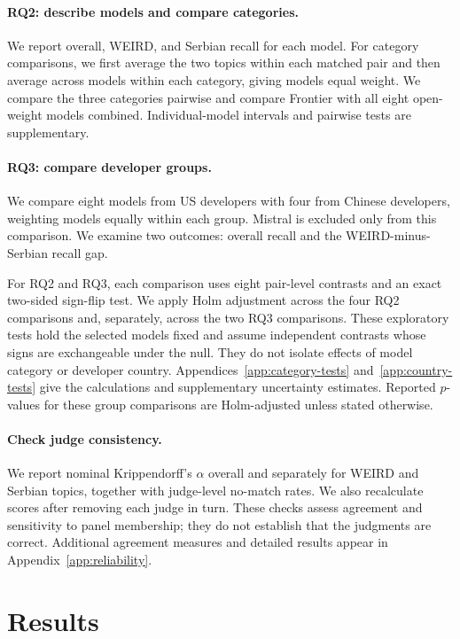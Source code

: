 \documentclass[11pt,a4paper]{article}
\begin{document}
\paragraph{RQ2: describe models and compare categories.}
We report overall, WEIRD, and Serbian recall for each model. For category comparisons, we first average the two topics within each matched pair and then average across models within each category, giving models equal weight. We compare the three categories pairwise and compare Frontier with all eight open-weight models combined. Individual-model intervals and pairwise tests are supplementary.

\paragraph{RQ3: compare developer groups.}
We compare eight models from US developers with four from Chinese developers, weighting models equally within each group. Mistral is excluded only from this comparison. We examine two outcomes: overall recall and the WEIRD-minus-Serbian recall gap.

For RQ2 and RQ3, each comparison uses eight pair-level contrasts and an exact two-sided sign-flip test. We apply Holm adjustment across the four RQ2 comparisons and, separately, across the two RQ3 comparisons. These exploratory tests hold the selected models fixed and assume independent contrasts whose signs are exchangeable under the null. They do not isolate effects of model category or developer country. Appendices~\ref{app:category-tests} and~\ref{app:country-tests} give the calculations and supplementary uncertainty estimates. Reported $p$-values for these group comparisons are Holm-adjusted unless stated otherwise.

\paragraph{Check judge consistency.}
We report nominal Krippendorff's $\alpha$ overall and separately for WEIRD and Serbian topics, together with judge-level no-match rates. We also recalculate scores after removing each judge in turn. These checks assess agreement and sensitivity to panel membership; they do not establish that the judgments are correct. Additional agreement measures and detailed results appear in Appendix~\ref{app:reliability}.

\section{Results}
\end{document}
